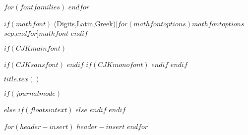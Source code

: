 $for(fontfamilies)$
  \setmonofont[$for(monofontoptions)$$monofontoptions$$sep$,$endfor$$if(monofontfallback)$,RawFeature={fallback=monofontfallback}$endif$]{$monofont$}
$endfor$

$if(mathfont)$
\setmathfont(Digits,Latin,Greek)[$for(mathfontoptions)$$mathfontoptions$$sep$,$endfor$]{$mathfont$}
$endif$

$if(CJKmainfont)$
    \usepackage{xeCJK}
    $if(CJKsansfont)$
    $endif$
    $if(CJKmonofont)$
    $endif$
$endif$

$title.tex()$

$if(journalmode)$
\usepackage{pbalance} 
\usepackage{float}
\makeatletter
\let\oldtpt\ThreePartTable
\let\endoldtpt\endThreePartTable
\def\ThreePartTable{\@ifnextchar[\ThreePartTable@i \ThreePartTable@ii}
\def\ThreePartTable@i[#1]{\begin{figure}[!htbp]
\onecolumn
\begin{minipage}{0.5\textwidth}
\oldtpt[#1]
}
\def\ThreePartTable@ii{\begin{figure}[!htbp]
\onecolumn
\begin{minipage}{0.5\textwidth}
\oldtpt
}
\def\endThreePartTable{
\endoldtpt
\end{minipage}
\twocolumn
\end{figure}}
\makeatother


\makeatletter
\let\endoldlt\endlongtable		
\def\endlongtable{
\hline
\endoldlt}
\makeatother

\newenvironment{twocolumntable}%
{%
\begin{table*}[!htbp]%
\onecolumn%
}%
{%
\twocolumn%
\end{table*}%
}%
$else$
\makeatletter
\let\endoldlt\endlongtable
\def\endlongtable{
\hline
\endoldlt
}
\makeatother
$if(floatsintext)$
$else$
\RequirePackage{longtable}
$endif$
$endif$



$for(header-insert)$
$header-insert$
$endfor$

\makeatletter
\xpatchcmd{\appendix}
  {\par}
  {\par}
  {}{}
\makeatother



